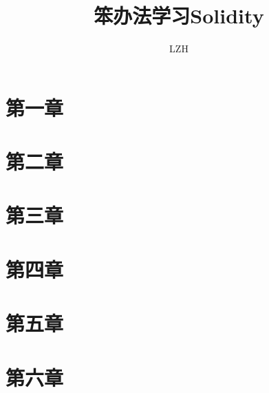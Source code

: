 \documentclass[a4paper, 12pt]{ctexart}
\title{笨办法学习Solidity}
\author{LZH }
\begin{document}
\maketitle
\section{第一章}
\section{第二章}
\section{第三章}
\section{第四章}
\section{第五章}
\section{第六章}
\end{document}
